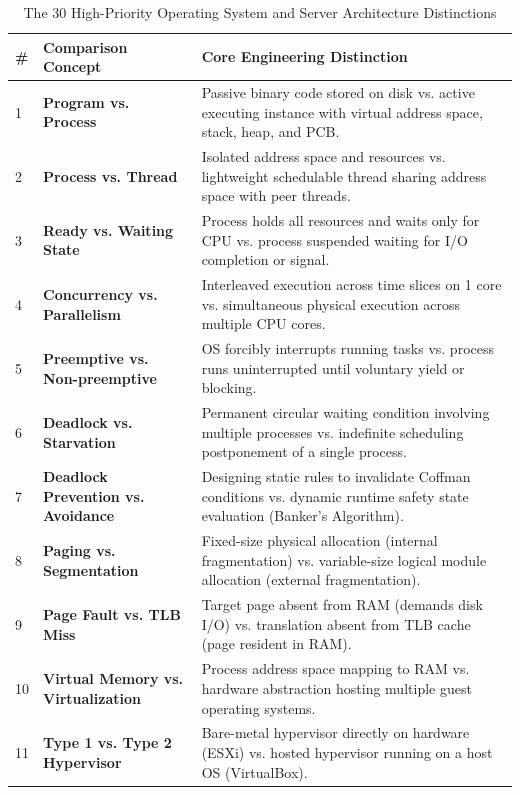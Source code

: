 \begin{table}[htbp]
\centering
\scriptsize
\caption{The 30 High-Priority Operating System and Server Architecture Distinctions}
\label{tab:30_os_distinctions}
\begin{tabularx}{\textwidth}{l p{3.2cm} X}
\toprule
\textbf{\#} & \textbf{Comparison Concept} & \textbf{Core Engineering Distinction} \\
\midrule
1 & \textbf{Program vs. Process} & Passive binary code stored on disk vs. active executing instance with virtual address space, stack, heap, and PCB. \\
2 & \textbf{Process vs. Thread} & Isolated address space and resources vs. lightweight schedulable thread sharing address space with peer threads. \\
3 & \textbf{Ready vs. Waiting State} & Process holds all resources and waits only for CPU vs. process suspended waiting for I/O completion or signal. \\
4 & \textbf{Concurrency vs. Parallelism} & Interleaved execution across time slices on 1 core vs. simultaneous physical execution across multiple CPU cores. \\
5 & \textbf{Preemptive vs. Non-preemptive} & OS forcibly interrupts running tasks vs. process runs uninterrupted until voluntary yield or blocking. \\
6 & \textbf{Deadlock vs. Starvation} & Permanent circular waiting condition involving multiple processes vs. indefinite scheduling postponement of a single process. \\
7 & \textbf{Deadlock Prevention vs. Avoidance} & Designing static rules to invalidate Coffman conditions vs. dynamic runtime safety state evaluation (Banker's Algorithm). \\
8 & \textbf{Paging vs. Segmentation} & Fixed-size physical allocation (internal fragmentation) vs. variable-size logical module allocation (external fragmentation). \\
9 & \textbf{Page Fault vs. TLB Miss} & Target page absent from RAM (demands disk I/O) vs. translation absent from TLB cache (page resident in RAM). \\
10 & \textbf{Virtual Memory vs. Virtualization} & Process address space mapping to RAM vs. hardware abstraction hosting multiple guest operating systems. \\
11 & \textbf{Type 1 vs. Type 2 Hypervisor} & Bare-metal hypervisor directly on hardware (ESXi) vs. hosted hypervisor running on a host OS (VirtualBox). \\

\end{tabularx}
\end{table}
